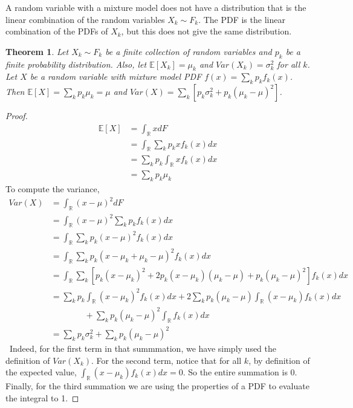 \documentclass{article}
\newtheorem{theorem}{Theorem}
\theoremstyle{definition}\newtheorem{definition}{DEF}
\theoremstyle{definition}\newtheorem{example}{Ex}
\theoremstyle{lemma}\newtheorem{lemma}{Lemma}
\theoremstyle{corrolary}\newtheorem{corrolary}{Cor}
\begin{document}
A random variable with a mixture model does not have a distribution that is the linear combination of the random variables $X_k \sim F_k$.
The PDF is the linear combination of the PDFs of $X_k$, but this does not give the same distribution.

\begin{theorem}\label{mixed_model_properties}
Let $X_k \sim F_k$ be a finite collection of random variables and $p_k$ be a finite probability distribution.
Also, let $\mathbb{E}[X_k]=\mu_k$ and $Var(X_k)=\sigma_k^2$ for all $k$.
Let $X$ be a random variable with mixture model PDF $f(x)=\sum_k p_k f_k(x)$.
Then $\mathbb{E}[X]=\sum_k p_k \mu_k =\mu$ and $Var(X)=\sum_k \left[ p_k \sigma_k^2 + p_k (\mu_k -\mu)^2 \right]$.
\end{theorem}
\begin{proof}
\begin{align*}
\mathbb{E}[X]&=\int_\mathbb{R} xdF\\
&= \int_\mathbb{R} \sum_k p_k x f_k(x) dx\\
&= \sum_k p_k \int_\mathbb{R} x f_k(x)dx\\
&= \sum_k p_k \mu_k
\end{align*}
To compute the variance,
\begin{align*}
Var(X)&=\int_\mathbb{R} (x-\mu)^2 dF\\
&= \int_\mathbb{R} (x-\mu )^2 \sum_k p_k  f_k (x) dx\\
&= \int_\mathbb{R} \sum_k p_k (x-\mu )^2 f_k(x) dx\\
&= \int_\mathbb{R} \sum_k p_k (x-\mu_k + \mu_k -\mu)^2  f_k(x) dx\\
&= \int_\mathbb{R} \sum_k \left[ p_k (x-\mu_k)^2 + 2p_k (x-\mu_k )(\mu_k -\mu) + p_k (\mu_k -\mu )^2\right] f_k (x) dx\\
&= \sum_k p_k \int_\mathbb{R} (x-\mu_k )^2 f_k(x) dx + 2 \sum_k p_k (\mu_k -\mu) \int_\mathbb{R} (x-\mu_k )f_k(x) dx\\
&\quad \quad \quad \quad + \sum_k p_k (\mu_k -\mu )^2 \int_\mathbb{R} f_k(x) dx\\
&= \sum_k p_k \sigma_k^2 + \sum_k p_k (\mu_k -\mu)^2
\end{align*}\
Indeed, for the first term in that summmation, we have simply used the definition of $Var(X_k)$.
For the second term, notice that for all $k$, by definition of the expected value, $\int_\mathbb{R} (x-\mu_k )f_k(x) dx=0$.
So the entire summation is 0.
Finally, for the third summation we are using the properties of a PDF to evaluate the integral to 1.
\end{proof}
\end{document}
